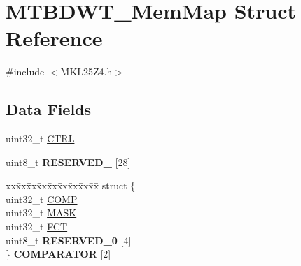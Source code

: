 \hypertarget{struct_m_t_b_d_w_t___mem_map}{}\section{M\+T\+B\+D\+W\+T\+\_\+\+Mem\+Map Struct Reference}
\label{struct_m_t_b_d_w_t___mem_map}


{\ttfamily \#include $<$M\+K\+L25\+Z4.\+h$>$}

\subsection*{Data Fields}
\begin{DoxyCompactItemize}
\item 
uint32\+\_\+t \hyperlink{struct_m_t_b_d_w_t___mem_map_aba0d8163fee473f1b1a2a8528f49639c}{C\+T\+RL}
\item 
\mbox{\label{struct_m_t_b_d_w_t___mem_map_a4e0b43e26991088f981cfcc4d3548c01}} 
uint8\+\_\+t {\bfseries R\+E\+S\+E\+R\+V\+E\+D\+\_} \mbox{[}28\mbox{]}
\item 
\mbox{\label{struct_m_t_b_d_w_t___mem_map_a30cf021d84f1eae5535e83d6ae3e1483}} 
\begin{tabbing}
xx\=xx\=xx\=xx\=xx\=xx\=xx\=xx\=xx\=\kill
struct \{\\
\>uint32\_t \hyperlink{struct_m_t_b_d_w_t___mem_map_a2dc253306d19e9f365e7ac79eecb8f07}{COMP}\\
\>uint32\_t \hyperlink{struct_m_t_b_d_w_t___mem_map_aaef890e895e809c3197697b5f53eaf43}{MASK}\\
\>uint32\_t \hyperlink{struct_m_t_b_d_w_t___mem_map_a245357bec738a4b4efe972976710ee58}{FCT}\\
\>uint8\_t {\bfseries RESERVED\_0} \mbox{[}4\mbox{]}\\
\} {\bfseries COMPARATOR} \mbox{[}2\mbox{]}\\


\end{tabbing}
\end{DoxyCompactItemize}
